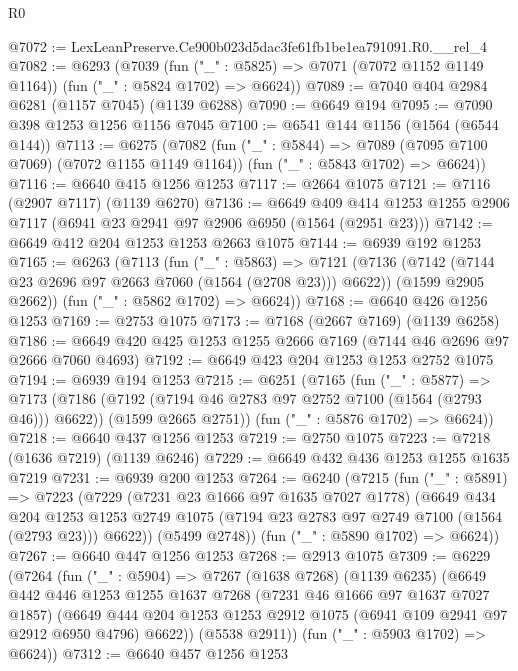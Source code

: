 \begin{lexlean}{R0}
\begin{coremodule}
@7072 := LexLeanPreserve.Ce900b023d5dac3fe61fb1be1ea791091.R0.__rel_4
@7082 := @6293
    (@7039
      (fun ("_" : @5825) => @7071 (@7072 @1152 @1149 @1164))
      (fun ("_" : @5824 @1702) => @6624))
@7089 := @7040 @404 @2984 @6281 (@1157 @7045) (@1139 @6288)
@7090 := @6649 @194
@7095 := @7090 @398 @1253 @1256 @1156 @7045
@7100 := @6541 @144 @1156 (@1564 (@6544 @144))
@7113 := @6275
    (@7082
      (fun ("_" : @5844) => @7089 (@7095 @7100 @7069) (@7072 @1155 @1149 @1164))
      (fun ("_" : @5843 @1702) => @6624))
@7116 := @6640 @415 @1256 @1253
@7117 := @2664 @1075
@7121 := @7116 (@2907 @7117) (@1139 @6270)
@7136 := @6649
    @409
    @414
    @1253
    @1255
    @2906
    @7117
    (@6941 @23 @2941 @97 @2906 @6950 (@1564 (@2951 @23)))
@7142 := @6649 @412 @204 @1253 @1253 @2663 @1075
@7144 := @6939 @192 @1253
@7165 := @6263
    (@7113
      (fun ("_" : @5863) =>
      @7121
        (@7136 (@7142 (@7144 @23 @2696 @97 @2663 @7060 (@1564 (@2708 @23))) @6622))
        (@1599 @2905 @2662))
      (fun ("_" : @5862 @1702) => @6624))
@7168 := @6640 @426 @1256 @1253
@7169 := @2753 @1075
@7173 := @7168 (@2667 @7169) (@1139 @6258)
@7186 := @6649 @420 @425 @1253 @1255 @2666 @7169 (@7144 @46 @2696 @97 @2666 @7060 @4693)
@7192 := @6649 @423 @204 @1253 @1253 @2752 @1075
@7194 := @6939 @194 @1253
@7215 := @6251
    (@7165
      (fun ("_" : @5877) =>
      @7173
        (@7186 (@7192 (@7194 @46 @2783 @97 @2752 @7100 (@1564 (@2793 @46))) @6622))
        (@1599 @2665 @2751))
      (fun ("_" : @5876 @1702) => @6624))
@7218 := @6640 @437 @1256 @1253
@7219 := @2750 @1075
@7223 := @7218 (@1636 @7219) (@1139 @6246)
@7229 := @6649 @432 @436 @1253 @1255 @1635 @7219
@7231 := @6939 @200 @1253
@7264 := @6240
    (@7215
      (fun ("_" : @5891) =>
      @7223
        (@7229
          (@7231 @23 @1666 @97 @1635 @7027 @1778)
          (@6649
            @434
            @204
            @1253
            @1253
            @2749
            @1075
            (@7194 @23 @2783 @97 @2749 @7100 (@1564 (@2793 @23)))
            @6622))
        (@5499 @2748))
      (fun ("_" : @5890 @1702) => @6624))
@7267 := @6640 @447 @1256 @1253
@7268 := @2913 @1075
@7309 := @6229
    (@7264
      (fun ("_" : @5904) =>
      @7267
        (@1638 @7268)
        (@1139 @6235)
        (@6649
          @442
          @446
          @1253
          @1255
          @1637
          @7268
          (@7231 @46 @1666 @97 @1637 @7027 @1857)
          (@6649 @444 @204 @1253 @1253 @2912 @1075 (@6941 @109 @2941 @97 @2912 @6950 @4796) @6622))
        (@5538 @2911))
      (fun ("_" : @5903 @1702) => @6624))
@7312 := @6640 @457 @1256 @1253

\end{coremodule}
\end{lexlean}
